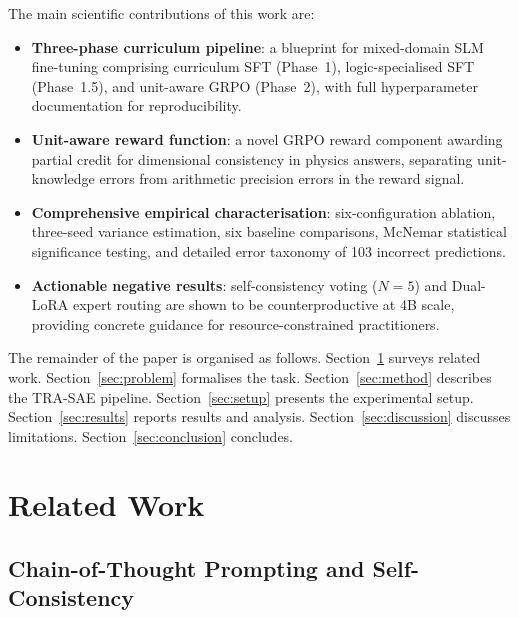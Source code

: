 \documentclass{ieeeaccess}
\newcommand{\modelname}{\textsc{TRA-SAE}}
\begin{document}
The main scientific contributions of this work are:

\begin{itemize}
  \item \textbf{Three-phase curriculum pipeline}: a blueprint for
        mixed-domain SLM fine-tuning comprising curriculum SFT (Phase~1),
        logic-specialised SFT (Phase~1.5), and unit-aware GRPO (Phase~2),
        with full hyperparameter documentation for reproducibility.

  \item \textbf{Unit-aware reward function}: a novel GRPO reward component
        awarding partial credit for dimensional consistency in physics
        answers, separating unit-knowledge errors from arithmetic precision
        errors in the reward signal.

  \item \textbf{Comprehensive empirical characterisation}: six-configuration
        ablation, three-seed variance estimation, six baseline comparisons,
        McNemar statistical significance testing, and detailed error taxonomy
        of 103 incorrect predictions.

  \item \textbf{Actionable negative results}: self-consistency voting
        ($N=5$) and Dual-LoRA expert routing are shown to be
        counterproductive at 4B scale, providing concrete guidance for
        resource-constrained practitioners.
\end{itemize}

The remainder of the paper is organised as follows.
Section~\ref{sec:related} surveys related work.
Section~\ref{sec:problem} formalises the task.
Section~\ref{sec:method} describes the \modelname{} pipeline.
Section~\ref{sec:setup} presents the experimental setup.
Section~\ref{sec:results} reports results and analysis.
Section~\ref{sec:discussion} discusses limitations.
Section~\ref{sec:conclusion} concludes.

\section{Related Work}
\label{sec:related}

\subsection{Chain-of-Thought Prompting and Self-Consistency}
\end{document}
